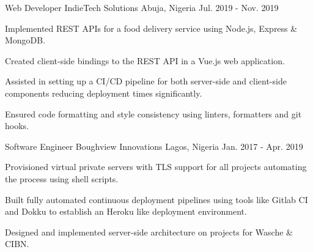 

\begin{cventries}

  \cventry
    {Web Developer} %
    {IndieTech Solutions} %
    {Abuja, Nigeria} %
    {Jul. 2019 - Nov. 2019} %
    {
      \begin{cvitems} %
        \item {Implemented REST APIs for a food delivery service using Node.js, Express \& MongoDB.}
        \item {Created client-side bindings to the REST API in a Vue.js web application.}
        \item {Assisted in setting up a CI/CD pipeline for both server-side and client-side components reducing deployment times significantly.}
        \item {Ensured code formatting and style consistency using linters, formatters and git hooks.}
      \end{cvitems}
    }

  \cventry
    {Software Engineer} %
    {Boughview Innovations} %
    {Lagos, Nigeria} %
    {Jan. 2017 - Apr. 2019} %
    {
      \begin{cvitems} %
        \item {Provisioned virtual private servers with TLS support for all projects automating the process using shell scripts.}
        \item {Built fully automated continuous deployment pipelines using tools like Gitlab CI and Dokku to establish an Heroku like deployment environment.}
        \item {Designed and implemented server-side architecture on projects for Wasche \& CIBN.}
      \end{cvitems}
    }

\end{cventries}
